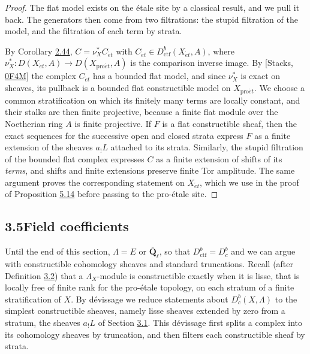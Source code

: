 \documentclass[11pt]{article}
\providecommand{\Dbc}{}\renewcommand{\Dbc}{D^b_c}
\begin{document}
\begin{proof}[{Proof}]\label{bp236}%
The flat model exists on the étale site by a classical result, and we pull it back. The generators then come from two filtrations: the stupid filtration of the model, and the filtration of each term by strata.

By Corollary \hyperref[bp132]{2.44}, \(C=\nu_X^*C_{\acute{e}t}\) with \(C_{\acute{e}t}\in D^b_{\mathrm{ctf}}(X_{\acute{e}t},A)\), where \(\nu_X^*:D(X_{\acute{e}t},A)\to D(X_{\mathrm{pro}\acute{e}t},A)\) is the comparison inverse image. By [Stacks, \href{https://stacks.math.columbia.edu/tag/0F4M}{0F4M}] the complex \(C_{\acute{e}t}\) has a bounded flat model, and since \(\nu_X^*\) is exact on sheaves, its pullback is a bounded flat constructible model on \(X_{\mathrm{pro}\acute{e}t}\). We choose a common stratification on which its finitely many terms are locally constant, and their stalks are then finite projective, because a finite flat module over the Noetherian ring \(A\) is finite projective. If \(F\) is a flat constructible sheaf, then the exact sequences for the successive open and closed strata express \(F\) as a finite extension of the sheaves \(a_!L\) attached to its strata. Similarly, the stupid filtration of the bounded flat complex expresses \(C\) as a finite extension of shifts of its \emph{terms}, and shifts and finite extensions preserve finite Tor amplitude. The same argument proves the corresponding statement on \(X_{\acute{e}t}\), which we use in the proof of Proposition \hyperref[bp451]{5.14} before passing to the pro-étale site.
\end{proof}


\subsection*{\texorpdfstring{3.5\quad Field coefficients}{3.5 Field coefficients}}
\label{bp237}%
\label{bp238}%
Until the end of this section, \(\Lambda=E\) or \(\overline{\mathbf Q}_\ell\), so that \(D^b_{\mathrm{ctf}}=\Dbc\) and we can argue with constructible cohomology sheaves and standard truncations. Recall (after Definition \hyperref[bp201]{3.2}) that a \(\Lambda_X\)-module is constructible exactly when it is lisse, that is locally free of finite rank for the pro-étale topology, on each stratum of a finite stratification of \(X\). By dévissage we reduce statements about \(\Dbc(X,\Lambda)\) to the simplest constructible sheaves, namely lisse sheaves extended by zero from a stratum, the sheaves \(a_!L\) of Section \hyperref[bp195]{3.1}. This dévissage first splits a complex into its cohomology sheaves by truncation, and then filters each constructible sheaf by strata.
\end{document}
